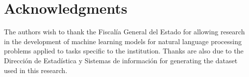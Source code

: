 \documentclass[onecolumn, journal, english, 12pt, a4paper]{IEEEtran} %
\theoremstyle{definition}
\begin{document}



\section*{Acknowledgments}

The authors wish to thank the Fiscalía General del Estado for allowing
research in the development of machine learning models for natural
language processing problems applied to tasks specific to the
institution. Thanks are also due to the Dirección de Estadística y
Sistemas de información for generating the dataset used in this
research.

\ifCLASSOPTIONcaptionsoff
  \newpage
\fi





%
%
%
\end{document}
